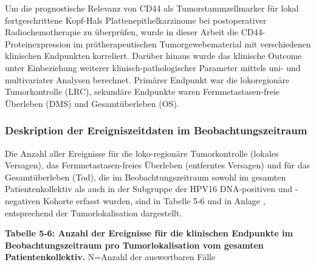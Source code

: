 Um die prognostische Relevanz von CD44 als Tumorstammzellmarker für lokal fortgeschrittene Kopf-Hals Plattenepithelkarzinome bei postoperativer Radiochemotherapie zu überprüfen, wurde in dieser Arbeit die CD44-Proteinexpression im prätherapeutischen Tumorgewebematerial mit verschiedenen klinischen Endpunkten korreliert. Darüber hinaus wurde das klinische Outcome unter Einbeziehung weiterer klinisch-pathologischer Parameter mittels uni- und multivariater Analysen berechnet. Primärer Endpunkt war die lokoregionäre Tumorkontrolle (LRC), sekundäre Endpunkte waren Fernmetastasen-freie Überleben (DMS) und Gesamtüberleben (OS).

\hypertarget{deskription-der-ereigniszeitdaten-im-beobachtungszeitraum}{%
\subsubsection{Deskription der Ereigniszeitdaten im Beobachtungszeitraum}\label{deskription-der-ereigniszeitdaten-im-beobachtungszeitraum}}

Die Anzahl aller Ereignisse für die loko-regionäre Tumorkontrolle (lokales Versagen), das Fernmetastasen-freies Überleben (entferntes Versagen) und für das Gesamtüberleben (Tod), die im Beobachtungszeitraum sowohl im gesamten Patientenkollektiv als auch in der Subgruppe der HPV16 DNA-positiven und -negativen Kohorte erfasst wurden, sind in Tabelle 5‑6 und in Anlage , entsprechend der Tumorlokalisation dargestellt.

\textbf{Tabelle 5‑6: Anzahl der Ereignisse für die klinischen Endpunkte im Beobachtungszeitraum pro Tumorlokalisation vom gesamten Patientenkollektiv.} N=Anzahl der auswertbaren Fälle


